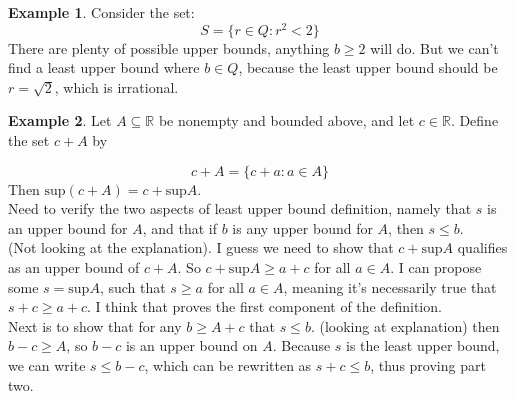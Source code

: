 \documentclass{article}
\numberwithin{equation}{subsection}
\theoremstyle{definition}
\newtheorem{example}{Example}
\begin{document}
\begin{example}
    Consider the set:
    $$
    S = \{r \in Q: r^2 < 2 \}
    $$
    There are plenty of possible upper bounds, anything $b \geq 2$ will do. But we can't
    find a least upper bound where $b \in Q$, because the least upper bound should be $r =
    \sqrt{2}$, which is irrational. 

\end{example}

\begin{example}
    Let $A \subseteq \mathbb{R}$ be nonempty and bounded above, and let $c \in
    \mathbb{R}$. Define the set $c + A$ by

    $$
    c + A = \{ c + a: a \in A \}
    $$
    Then $\text{sup}(c + A) = c + \text{sup}A$.\\

    Need to verify the two aspects of least upper bound definition, namely that $s$ is an
    upper bound for $A$, and that if $b$ is any upper bound for $A$, then $s \leq b$.\\

    (Not looking at the explanation). I guess we need to show that $c + \text{sup}A$
    qualifies as an upper bound of $c + A$. So $c + \text{sup}A \geq a + c$ for all $a \in
    A$. I can propose some $s = \text{sup}A$, such that $s \geq a$ for all $a \in A$,
    meaning it's necessarily true that $s + c \geq a + c$. I think that proves the first
    component of the definition. \\

    Next is to show that for any $b \geq A + c$ that $s \leq b$. (looking at explanation)
    then $b - c \geq A$, so $b-c$ is an upper bound on $A$. Because $s$ is the least upper
    bound, we can write $s \leq b - c$, which can be rewritten as $s + c \leq b$, thus
    proving part two.

\end{example}
\end{document}
